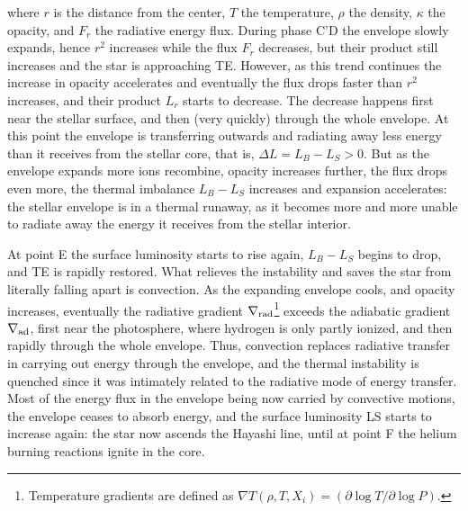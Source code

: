 \documentclass[a4paper,10pt]{article}
\begin{document}
{\noindent}where $r$ is the distance from the center, $T$ the temperature, $\rho$ the density, $\kappa$ the opacity, and $F_r$ the radiative energy flux. During phase C'D the envelope slowly expands, hence $r^2$ increases while the flux $F_r$ decreases, but their product still increases and the star is approaching TE. However, as this trend continues the increase in opacity accelerates and eventually the flux drops faster than $r^2$ increases, and their product $L_r$ starts to decrease. The decrease happens first near the stellar surface, and then (very quickly) through the whole envelope. At this point the envelope is transferring outwards and radiating away less energy than it receives from the stellar core, that is, $\Delta L=L_B-L_S>0$. But as the envelope expands more ions recombine, opacity increases further, the flux drops even more, the thermal imbalance $L_B-L_S$ increases and expansion accelerates: the stellar envelope is in a thermal runaway, as it becomes more and more unable to radiate away the energy it receives from the stellar interior.

{\noindent}At point E the surface luminosity starts to rise again, $L_B-L_S$ begins to drop, and TE is rapidly restored. What relieves the instability and saves the star from literally falling apart is convection. As the expanding envelope cools, and opacity increases, eventually the radiative gradient $\nabla_{\rm rad}$\footnote{Temperature gradients are defined as $\nabla T(\rho,T,X_i) = (\partial\log T/\partial\log P)$.} exceeds the adiabatic gradient $\nabla_{\rm ad}$, first near the photosphere, where hydrogen is only partly ionized, and then rapidly through the whole envelope. Thus, convection replaces radiative transfer in carrying out energy through the envelope, and the thermal instability is quenched since it was intimately related to the radiative mode of energy transfer. Most of the energy flux in the envelope being now carried by convective motions, the envelope ceases to absorb energy, and the surface luminosity LS starts to increase again: the star now ascends the Hayashi line, until at point F the helium burning reactions ignite in the core.
\end{document}
